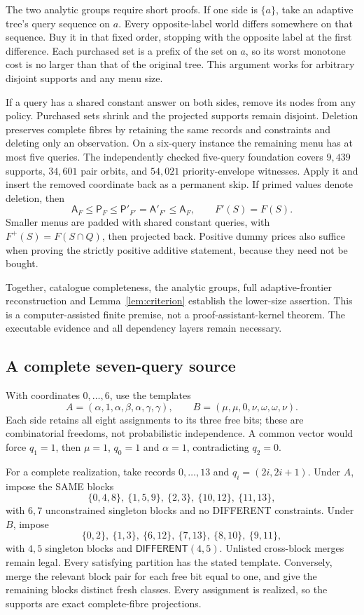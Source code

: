 \documentclass[pdflatex,sn-mathphys-num]{sn-jnl}
\newcommand{\A}{\mathsf{A}}
\newcommand{\Pcost}{\mathsf{P}}
\newcommand{\DIFF}{\mathsf{DIFFERENT}}
\theoremstyle{thmstyleone}
\theoremstyle{thmstylethree}
\theoremstyle{thmstyletwo}
\begin{document}
The two analytic groups require short proofs. If one side is $\{a\}$, take an adaptive tree's query sequence on $a$. Every opposite-label world differs somewhere on that sequence. Buy it in that fixed order, stopping with the opposite label at the first difference. Each purchased set is a prefix of the set on $a$, so its worst monotone cost is no larger than that of the original tree. This argument works for arbitrary disjoint supports and any menu size.

If a query has a shared constant answer on both sides, remove its nodes from any policy. Purchased sets shrink and the projected supports remain disjoint. Deletion preserves complete fibres by retaining the same records and constraints and deleting only an observation. On a six-query instance the remaining menu has at most five queries. The independently checked five-query foundation covers $9,439$ supports, $34,601$ pair orbits, and $54,021$ priority-envelope witnesses. Apply it and insert the removed coordinate back as a permanent skip. If primed values denote deletion, then
\[
 \A_F\leq\Pcost_F\leq\Pcost'_{F'}=\A'_{F'}\leq\A_F,
 \qquad F'(S)=F(S).
\]
Smaller menus are padded with shared constant queries, with $F^+(S)=F(S\cap Q)$, then projected back. Positive dummy prices also suffice when proving the strictly positive additive statement, because they need not be bought.

Together, catalogue completeness, the analytic groups, full adaptive-frontier reconstruction and Lemma~\ref{lem:criterion} establish the lower-size assertion. This is a computer-assisted finite premise, not a proof-assistant-kernel theorem. The executable evidence and all dependency layers remain necessary.

\subsection{A complete seven-query source}\label{sec:seven}
With coordinates $0,\ldots,6$, use the templates
\[
 A=(\alpha,1,\alpha,\beta,\alpha,\gamma,\gamma),\qquad
 B=(\mu,\mu,0,\nu,\omega,\omega,\nu).
\]
Each side retains all eight assignments to its three free bits; these are combinatorial freedoms, not probabilistic independence. A common vector would force $q_1=1$, then $\mu=1$, $q_0=1$ and $\alpha=1$, contradicting $q_2=0$.

For a complete realization, take records $0,\ldots,13$ and $q_i=(2i,2i+1)$. Under $A$, impose the SAME blocks
\[
 \{0,4,8\},\ \{1,5,9\},\ \{2,3\},\ \{10,12\},\ \{11,13\},
\]
with $6,7$ unconstrained singleton blocks and no DIFFERENT constraints. Under $B$, impose
\[
 \{0,2\},\ \{1,3\},\ \{6,12\},\ \{7,13\},\ \{8,10\},\ \{9,11\},
\]
with $4,5$ singleton blocks and $\DIFF(4,5)$. Unlisted cross-block merges remain legal. Every satisfying partition has the stated template. Conversely, merge the relevant block pair for each free bit equal to one, and give the remaining blocks distinct fresh classes. Every assignment is realized, so the supports are exact complete-fibre projections.
\end{document}
